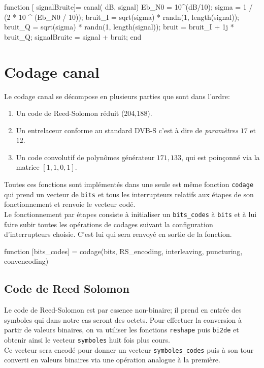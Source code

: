 \documentclass[a4paper,11pt]{article}
\begin{document}
\begin{lstun}
	function [ signalBruite]= canal( dB, signal)
	Eb_N0 = 10^(dB/10);
	sigma = 1 / (2 * 10 ^ (Eb_N0 / 10));
	bruit_I = sqrt(sigma) * randn(1, length(signal));
	bruit_Q = sqrt(sigma) * randn(1, length(signal));
	bruit = bruit_I + 1j * bruit_Q;
	signalBruite = signal + bruit;
	end	
\end{lstun}

\section{Codage canal}
Le codage canal se décompose en plusieurs parties que sont dans l'ordre:
\begin{enumerate}
	\item Un code de Reed-Solomon réduit (204,188).
	\item Un entrelaceur conforme au standard DVB-S c'est à dire de \emph{paramètres} $17$ et $12$.
	\item Un code convolutif de polynômes générateur $171, 133$, qui est poinçonné via la matrice $[1,1,0,1]$.
\end{enumerate}

Toutes ces fonctions sont implémentés dans une seule est même fonction \texttt{codage} qui prend un vecteur de \texttt{bits} et tous les interrupteurs relatifs aux étapes de son fonctionnement et renvoie le vecteur codé. \\
Le fonctionnement par étapes consiste à initialiser un \texttt{bits\_codes}
à \texttt{bits} et à lui faire subir toutes les opérations de codages suivant la configuration d'interrupteurs choisie. C'est lui qui sera renvoyé en sortie de la fonction.

\begin{lstun}
function [bits_codes] = codage(bits, RS_encoding, interleaving, puncturing, convencoding)
\end{lstun}
\subsection{Code de Reed Solomon}
Le code de Reed-Solomon est par essence non-binaire; il prend en entrée des symboles qui dans notre cas seront des octets. Pour effectuer la conversion à partir de valeurs binaires, on va utiliser les fonctions \texttt{reshape} puis \texttt{bi2de} et obtenir ainsi le vecteur \texttt{symboles} huit fois plus cours. \\
Ce vecteur sera encodé pour donner un vecteur \texttt{symboles\_codes} puis à son tour converti en valeurs binaires via une opération analogue à la première.
\end{document}
